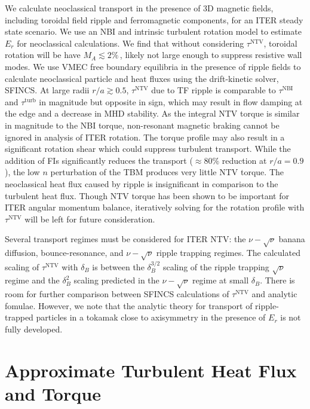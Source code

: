 \documentclass[aip, pop, preprint]{revtex4-1}
\numberwithin{figure}{section}
\numberwithin{equation}{section}
\begin{document}
We calculate neoclassical transport in the presence of 3D magnetic fields, including toroidal field ripple and ferromagnetic components, for an ITER steady state scenario. We use an NBI and intrinsic turbulent rotation model to estimate $E_r$ for neoclassical calculations. We find that without considering $\tau^{\mathrm{NTV}}$, toroidal rotation will be have $M_A \lesssim 2\% \,$, likely not large enough to suppress resistive wall modes.\cite{Liu2004} We use VMEC free boundary equilibria in the presence of ripple fields to calculate neoclassical particle and heat fluxes using the drift-kinetic solver, SFINCS. At large radii $r/a \gtrsim 0.5$, $\tau^{\mathrm{NTV}}$ due to TF ripple is comparable to $\tau^{\mathrm{NBI}}$ and $\tau^{\mathrm{turb}}$ in magnitude but opposite in sign, which may result in flow damping at the edge and a decrease in MHD stability. As the integral NTV torque is similar in magnitude to the NBI torque, non-resonant magnetic braking cannot be ignored in analysis of ITER rotation. The torque profile may also result in a significant rotation shear which could suppress turbulent transport. While the addition of FIs significantly reduces the transport ($\approx 80\%$ reduction at $r/a = 0.9$), the low $n$ perturbation of the TBM produces very little NTV torque. The neoclassical heat flux caused by ripple is insignificant in comparison to the turbulent heat flux. Though NTV torque has been shown to be important for ITER angular momentum balance, iteratively solving for the rotation profile with $\tau^{\mathrm{NTV}}$ will be left for future consideration.  

Several transport regimes must be considered for ITER NTV: the $\nu-\sqrt{\nu}$ banana diffusion, bounce-resonance, and $\nu-\sqrt{\nu}$ ripple trapping regimes. The calculated scaling of $\tau^{\mathrm{NTV}}$ with $\delta_B$ is between the $\delta_B^{3/2}$ scaling of the ripple trapping $\sqrt{\nu}$ regime and the $\delta_B^2$ scaling predicted in the $\nu-\sqrt{\nu}$ regime at small $\delta_B$. There is room for further comparison between SFINCS calculations of $\tau^{\mathrm{NTV}}$ and analytic fomulae. However, we note that the analytic theory for transport of ripple-trapped particles in a tokamak close to axisymmetry in the presence of $E_r$ is not fully developed. 

\appendix

\section{Approximate Turbulent Heat Flux and Torque}\label{turbQ}
\end{document}
